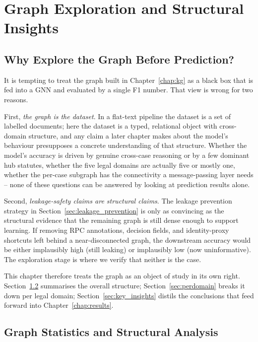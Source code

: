 \chapter{Graph Exploration and Structural Insights}
\label{chap:graph_exploration}

\section{Why Explore the Graph Before Prediction?}

It is tempting to treat the graph built in Chapter~\ref{chap:kg} as a
black box that is fed into a GNN and evaluated by a single F1 number.
That view is wrong for two reasons.

First, \emph{the graph is the dataset}. In a flat-text pipeline the
dataset is a set of labelled documents; here the dataset is a typed,
relational object with cross-domain structure, and any claim a later
chapter makes about the model's behaviour presupposes a concrete
understanding of that structure. Whether the model's accuracy is
driven by genuine cross-case reasoning or by a few dominant hub
statutes, whether the five legal domains are actually five or mostly
one, whether the per-case subgraph has the connectivity a
message-passing layer needs -- none of these questions can be answered
by looking at prediction results alone.

Second, \emph{leakage-safety claims are structural claims}. The
leakage prevention strategy in
Section~\ref{sec:leakage_prevention} is only as convincing as the
structural evidence that the remaining graph is still dense enough to
support learning. If removing RPC annotations, decision fields, and
identity-proxy shortcuts left behind a near-disconnected graph, the
downstream accuracy would be either implausibly high (still leaking)
or implausibly low (now uninformative). The exploration stage is
where we verify that neither is the case.

This chapter therefore treats the graph as an object of study in its
own right. Section~\ref{sec:graph_stats} summarises the overall
structure; Section~\ref{sec:perdomain} breaks it down per legal
domain; Section~\ref{sec:key_insights} distils the conclusions that
feed forward into Chapter~\ref{chap:results}.

\section{Graph Statistics and Structural Analysis}
\label{sec:graph_stats}

